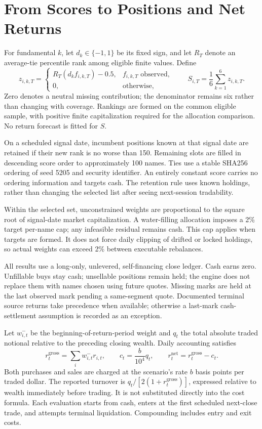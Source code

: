 \documentclass[11pt]{article}
\begin{document}
\section{From Scores to Positions and Net Returns}
For fundamental $k$, let $d_k\in\{-1,1\}$ be its fixed sign, and let $R_T$ denote an average-tie percentile rank among eligible finite values. Define
\begin{equation}
z_{i,k,T}=\begin{cases}R_T(d_k f_{i,k,T})-0.5,&f_{i,k,T}\text{ observed},\\0,&\text{otherwise},\end{cases}
\qquad S_{i,T}=\frac{1}{6}\sum_{k=1}^6 z_{i,k,T}.
\label{eq:composite}
\end{equation}
Zero denotes a neutral missing contribution; the denominator remains six rather than changing with coverage. Rankings are formed on the common eligible sample, with positive finite capitalization required for the allocation comparison. No return forecast is fitted for $S$.

On a scheduled signal date, incumbent positions known at that signal date are retained if their new rank is no worse than 150. Remaining slots are filled in descending score order to approximately 100 names. Ties use a stable SHA256 ordering of seed 5205 and security identifier. An entirely constant score carries no ordering information and targets cash. The retention rule uses known holdings, rather than changing the selected list after seeing next-session tradability.

Within the selected set, unconstrained weights are proportional to the square root of signal-date market capitalization. A water-filling allocation imposes a 2\% target per-name cap; any infeasible residual remains cash. This cap applies when targets are formed. It does not force daily clipping of drifted or locked holdings, so actual weights can exceed 2\% between executable rebalances.

All results use a long-only, unlevered, self-financing close ledger. Cash earns zero. Unfillable buys stay cash; unsellable positions remain held; the engine does not replace them with names chosen using future quotes. Missing marks are held at the last observed mark pending a same-segment quote. Documented terminal source returns take precedence when available; otherwise a last-mark cash-settlement assumption is recorded as an exception.

Let $w^-_{i,t}$ be the beginning-of-return-period weight and $q_t$ the total absolute traded notional relative to the preceding closing wealth. Daily accounting satisfies
\begin{equation}
r^{\mathrm{gross}}_t=\sum_i w^-_{i,t}r_{i,t},\qquad
c_t=\frac{b}{10^4}q_t,\qquad r^{\mathrm{net}}_t=r^{\mathrm{gross}}_t-c_t.
\end{equation}
Both purchases and sales are charged at the scenario's rate $b$ basis points per traded dollar. The reported turnover is $q_t/[2(1+r^{\mathrm{gross}}_t)]$, expressed relative to wealth immediately before trading. It is not substituted directly into the cost formula. Each evaluation starts from cash, enters at the first scheduled next-close trade, and attempts terminal liquidation. Compounding includes entry and exit costs.
\end{document}
